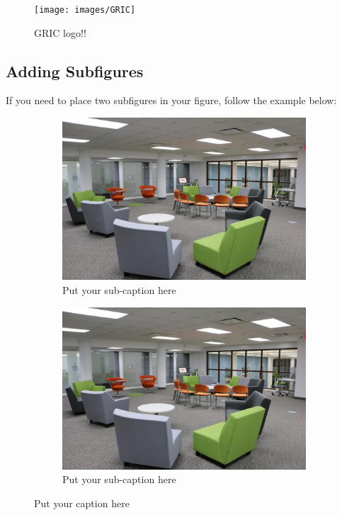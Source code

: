 \begin{figure}[h]
\begin{center}
\texttt{[image: images/GRIC]} %
\end{center}
\caption{GRIC logo!!} %
\label{gric}
\end{figure}

%


\subsection{Adding Subfigures}
\noindent If you need to place two subfigures in your figure, follow the example below:

\begin{figure}[h!]
\begin{subfigure}{.48\textwidth}
  \centering
  \includegraphics[width=.8\linewidth]{images/2}  
  \caption{Put your sub-caption here}
  \label{fig:sub-first}
\end{subfigure}
\begin{subfigure}{.48\textwidth}
  \centering
  \includegraphics[width=.8\linewidth]{images/2}  
  \caption{Put your sub-caption here}
  \label{fig:sub-second}
\end{subfigure}
\caption{Put your caption here}
\end{figure}


